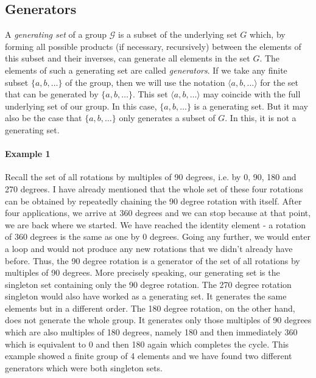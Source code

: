 \subsection{Generators}

A \emph{generating set} of a group $\mathcal{G}$ is a subset of the underlying set $G$ which, by forming all possible products (if necessary, recursively) between the elements of this subset and their inverses, can generate all elements in the set $G$. The elements of such a generating set are called \emph{generators}. If we take any finite subset $\{ a, b, \ldots \}$ of the group, then we will use the notation $\langle a, b, \ldots \rangle$ for the set that can be generated by $\{ a, b, \ldots \}$. This set $\langle a, b, \ldots \rangle$ may coincide with the full underlying set of our group. In this case, $\{ a, b, \ldots \}$ is a generating set. But it may also be the case that $\{ a, b, \ldots \}$ only generates a subset of $G$. In this, it is not a generating set.


\paragraph{Example 1} Recall the set of all rotations by multiples of 90 degrees, i.e. by 0, 90, 180 and 270 degrees. I have already mentioned that the whole set of these four rotations can be obtained by repeatedly chaining the 90 degree rotation with itself. After four applications, we arrive at 360 degrees and we can stop because at that point, we are back where we started. We have reached the identity element - a rotation of 360 degrees is the same as one by 0 degrees. Going any further, we would enter a loop and would not produce any new rotations that we didn't already have before. Thus, the 90 degree rotation is a generator of the set of all rotations by multiples of 90 degrees. More precisely speaking, our generating set is the singleton set containing only the 90 degree rotation. The 270 degree rotation singleton would also have worked as a generating set. It generates the same elements but in a different order. The 180 degree rotation, on the other hand, does not generate the whole group. It generates only those multiples of 90 degrees which are also multiples of 180 degrees, namely 180 and then immediately 360 which is equivalent to 0 and then 180 again which completes the cycle. This example showed a finite group of 4 elements and we have found two different generators which were both singleton sets.

